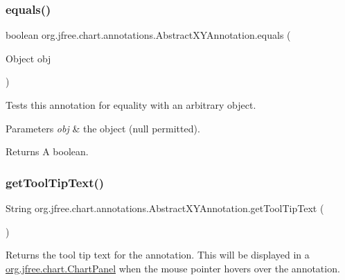 \subsubsection{\texorpdfstring{equals()}{equals()}}
{\footnotesize\ttfamily boolean org.\+jfree.\+chart.\+annotations.\+Abstract\+X\+Y\+Annotation.\+equals (\begin{DoxyParamCaption}\item[{Object}]{obj }\end{DoxyParamCaption})}

Tests this annotation for equality with an arbitrary object.


\begin{DoxyParams}{Parameters}
{\em obj} & the object ({\ttfamily null} permitted).\\
\hline
\end{DoxyParams}
\begin{DoxyReturn}{Returns}
A boolean. 
\end{DoxyReturn}
\mbox{\label{classorg_1_1jfree_1_1chart_1_1annotations_1_1_abstract_x_y_annotation_a800bd322b53941c7fe518d9578dab7ce}} 
\subsubsection{\texorpdfstring{get\+Tool\+Tip\+Text()}{getToolTipText()}}
{\footnotesize\ttfamily String org.\+jfree.\+chart.\+annotations.\+Abstract\+X\+Y\+Annotation.\+get\+Tool\+Tip\+Text (\begin{DoxyParamCaption}{ }\end{DoxyParamCaption})}

Returns the tool tip text for the annotation. This will be displayed in a \mbox{\hyperlink{classorg_1_1jfree_1_1chart_1_1_chart_panel}{org.\+jfree.\+chart.\+Chart\+Panel}} when the mouse pointer hovers over the annotation.

